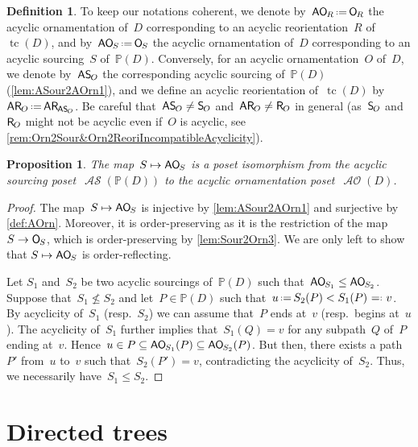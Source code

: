 \documentclass{amsart}
\newtheorem{proposition}[theorem]{Proposition}
\theoremstyle{definition}
\newtheorem{definition}[theorem]{Definition}
\renewcommand{\c}[1]{\mathcal{#1}} %
\newcommand{\eqdef}{\mbox{\,\raisebox{0.2ex}{\scriptsize\ensuremath{\mathrm:}}\ensuremath{=}\,}} %
\newcommand{\defeq}{\mbox{~\ensuremath{=}\raisebox{0.2ex}{\scriptsize\ensuremath{\mathrm:}} }} %
\DeclareMathOperator{\tc}{tc} %
\newcommand{\mymap}[2]{\mathsf{#1}_{\hspace{-.7pt}#2}}
\newcommand{\orn}[1]{\mymap{O}{#1}}  %
\DeclareMathOperator{\AOrn}{\c{AO}}  %
\newcommand{\aorn}[1]{\mymap{AO}{#1}}  %
\newcommand{\reori}[1]{\mymap{R}{#1}}  %
\newcommand{\areori}[1]{\mymap{AR}{#1}}  %
\newcommand{\sour}[1]{\mymap{S}{#1}}  %
\DeclareMathOperator{\ASour}{\mathcal{AS}}  %
\newcommand{\asour}[1]{\mymap{AS}{#1}}  %
\newcommand{\PP}{\mathbb P} %
\begin{document}
\begin{definition}
\label{def:moreNotations}
To keep our notations coherent, we denote by~$\aorn{R} \eqdef \orn{R}$ the acyclic ornamentation of~$D$ corresponding to an acyclic reorientation~$R$ of~$\tc(D)$, and by~$\aorn{S} \eqdef \orn{S}$ the acyclic ornamentation of~$D$ corresponding to an acyclic sourcing~$S$ of~$\PP(D)$.
Conversely, for an acyclic ornamentation~$O$ of~$D$, we denote by~$\asour{O}$ the corresponding acyclic sourcing of~$\PP(D)$ (\cref{lem:ASour2AOrn1}), and we define an acyclic reorientation of~$\tc(D)$ by~$\areori{O} \eqdef \areori{\asour{O}}$.
Be careful that~$\asour{O} \ne \sour{O}$ and~$\areori{O} \ne \reori{O}$ in general (as~$\sour{O}$ and~$\reori{O}$ might not be acyclic even if~$O$ is acyclic, see \cref{rem:Orn2Sour&Orn2ReoriIncompatibleAcyclicity}).
\end{definition}

\begin{proposition}
\label{prop:ASour2AOrn}
The map~$S \mapsto \aorn{S}$ is a poset isomorphism from the acyclic sourcing poset~$\ASour(\PP(D))$ to the acyclic ornamentation poset~$\AOrn(D)$.
\end{proposition}

\begin{proof}
The map~$S \mapsto \aorn{S}$ is injective by \cref{lem:ASour2AOrn1} and surjective by \cref{def:AOrn}.
Moreover, it is order-preserving as it is the restriction of the map $S \to \orn{S}$, which is order-preserving by \cref{lem:Sour2Orn3}.
We are only left to show that $S \mapsto \aorn{S}$ is order-reflecting.

Let $S_1$ and~$S_2$ be two acyclic sourcings of~$\PP(D)$ such that~$\aorn{S_1} \leq \aorn{S_2}$.
Suppose that~$S_1 \not\leq S_2$ and let~$P \in \PP(D)$ such that~$u \eqdef S_2(P) < S_1(P) \defeq v$.
By acyclicity of~$S_1$ (resp.~$S_2$) we can assume that~$P$ ends at~$v$ (resp.~begins at~$u$).
The acyclicity of~$S_1$ further implies that~$S_1(Q) = v$ for any subpath~$Q$ of~$P$ ending at~$v$.
Hence~$u \in P \subseteq \aorn{S_1}(P) \subseteq \aorn{S_2}(P)$.
But then, there exists a path~$P'$ from~$u$ to~$v$ such that~$S_2(P') = v$, contradicting the acyclicity of~$S_2$.
Thus, we necessarily have~$S_1 \leq S_2$.
\end{proof}


\section{Directed trees}
\label{sec:trees}
\end{document}
